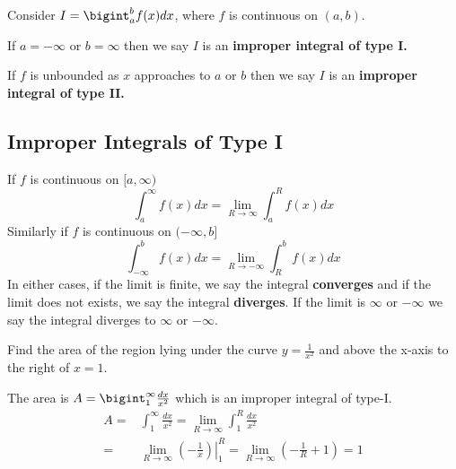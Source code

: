\documentclass[../calc1-main.tex]{subfiles}
\begin{document}
Consider $I = \bigint_a^b f(x) dx$, where $f$ is continuous on $(a, b)$.

If $a=-\infty$ or $b=\infty$ then we say $I$ is an \textbf{improper integral of type I.}

If $f$ is unbounded as $x$ approaches to $a$ or $b$ then we say $I$ is an \textbf{improper integral of type II.}

\subsection*{Improper Integrals of Type I}
\begin{definition}
  If $f$ is continuous on $[a, \infty)$
  \[
    \int_a^{\infty} f(x) dx = \lim_{R \to \infty} \int_a^R f(x) dx
  \]
  Similarly if $f$ is continuous on $(-\infty, b]$
  \[
    \int_{-\infty}^b f(x) dx = \lim_{R \to -\infty} \int_R^b f(x) dx
  \]
  In either cases, if the limit is finite, we say the integral \textbf{converges} and if the limit does not exists, we say the integral \textbf{diverges}. If the limit is $\infty$ or $-\infty$ we say the integral diverges to $\infty$ or $-\infty$.
\end{definition}

\begin{example}
	Find the area of the region lying under the curve $y=\frac{1}{x^2}$ and above the x-axis to the right of $x=1$.
\end{example}

\begin{minipage}{0.5\textwidth}
  \begin{solution}
  	The area is $A = \bigint_1^{\infty} \frac{dx}{x^2}$ which is an improper integral  of type-I.
  	\[
  	\begin{split}
  		A = &
  		\int_1^{\infty} \frac{dx}{x^2} = \lim_{R \to \infty} \int_1^R \frac{dx}{x^2} \\
  		= & \lim_{R \to \infty} \left.\left( -\frac{1}{x} \right)\right \vert_1^R=
  		\lim_{R \to \infty} \left( -\frac{1}{R} + 1 \right) =
  		1
  	\end{split}
  	\]
  \end{solution}
\end{minipage}%
\begin{minipage}{0.5\textwidth}
	\begin{figure}[H]
  \centering
	\end{figure}
\end{minipage}
\end{document}
